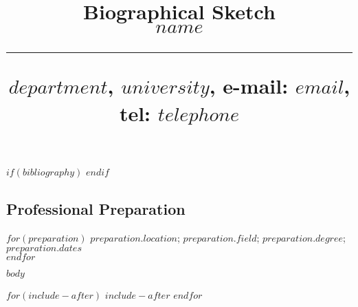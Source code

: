 \documentclass[svgnames,11pt]{article}
\title{%
        \vspace{-2\baselineskip}
            \normalsize
            Biographical Sketch\\
            {\large\textbf{$name$}}\\
            \vspace{0.5\baselineskip}
            \hrule
            \vspace{0.5\baselineskip}
            $department$, $university$, e-mail: \href{mailto:$email$}{$email$}, tel: $telephone$
        \vspace{-1.5ex}
        }
\date{}
\author{}
\begin{document}
$if(bibliography)$
$endif$


\maketitle
\vspace{-4\baselineskip}


\subsection{Professional Preparation}

  $for(preparation)$
      $preparation.location$; $preparation.field$; $preparation.degree$; $preparation.dates$ \\
  $endfor$



$body$



$for(include-after)$
  $include-after$
$endfor$
\end{document}
